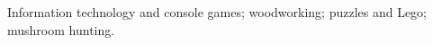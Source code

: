 
\begin{cvinterests}


\cvinterest
{Information technology and console games; woodworking; puzzles and Lego;
mushroom hunting.}

\end{cvinterests}
